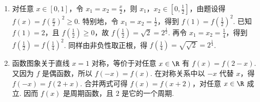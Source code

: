 \begin{solution}
\begin{enumerate}
\item 对任意 \(x\in[0,1]\)，令 \(x_1=x_2=\frac{x}{2}\)，则 \(x_1\)，\(x_2\in\left[0,\frac12\right]\)，由题设得
\(f(x)=f\left(\frac{x}{2}\right)^2\geqslant0\). 特别地，令 \(x_1=x_2=\frac12\)，得到
\(f(1)=f\left(\frac12\right)^2\). 已知 \(f(1)=2\)，且 \(f\left(\frac12\right)\geqslant0\)，故 \(f\left(\frac12\right)=\sqrt{2}=2^{\frac12}\). 再令 \(x_1=x_2=\frac14\)，得到
\(f\left(\frac12\right)=f\left(\frac14\right)^2\). 同样由非负性取正根，得 \(f\left(\frac14\right)=\sqrt{\sqrt{2}}=2^{\frac14}\).
\item 函数图象关于直线 \(x=1\) 对称，等价于对任意 \(x\in\R\) 有 \(f(x)=f(2-x)\). 又因为 \(f\) 是偶函数，所以 \(f(-x)=f(x)\). 在对称关系中以 \(-x\) 代替 \(x\)，得 \(f(-x)=f(2+x)\). 合并两式可得 \(f(x)=f(x+2)\)，对任意 \(x\in\R\) 成立. 因而 \(f(x)\) 是周期函数，且 \(2\) 是它的一个周期.
\end{enumerate}
\end{solution}
